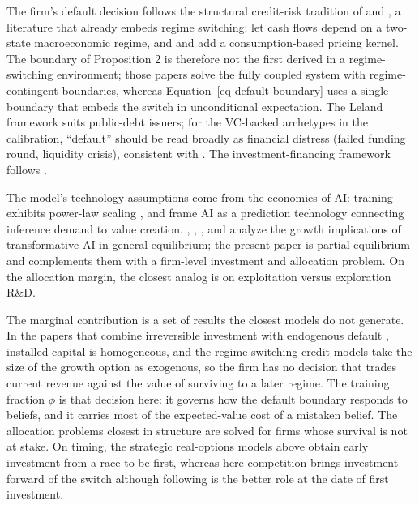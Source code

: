 \documentclass[
  11pt,
  letterpaper,
]{scrartcl}
\begin{document}
The firm's default decision follows the structural credit-risk tradition
of \citet{merton1974pricing} and \citet{leland1994corporate}, a
literature that already embeds regime switching:
\citet{hackbarth2006capital} let cash flows depend on a two-state
macroeconomic regime, and \citet{chen2010macroeconomic} and
\citet{bhamra2010levered} add a consumption-based pricing kernel. The
boundary of Proposition 2 is therefore not the first derived in a
regime-switching environment; those papers solve the fully coupled
system with regime-contingent boundaries, whereas
Equation~\ref{eq-default-boundary} uses a single boundary that embeds
the switch in unconditional expectation. The Leland framework suits
public-debt issuers; for the VC-backed archetypes in the calibration,
``default'' should be read broadly as financial distress (failed funding
round, liquidity crisis), consistent with \citet{gornall2020squaring}.
The investment-financing framework follows
\citet{hackbarth2012corporate}.

The model's technology assumptions come from the economics of AI:
training exhibits power-law scaling
\citep{kaplan2020scaling, hoffmann2022training}, and
\citet{agrawal2019economics} frame AI as a prediction technology
connecting inference demand to value creation.
\citet{aghion2019artificial}, \citet{acemoglu2024simple},
\citet{korinek2024scenarios}, and \citet{jones2024agi} analyze the
growth implications of transformative AI in general equilibrium; the
present paper is partial equilibrium and complements them with a
firm-level investment and allocation problem. On the allocation margin,
the closest analog is \citet{akcigit2018growth} on exploitation versus
exploration R\&D.

The marginal contribution is a set of results the closest models do not
generate. In the papers that combine irreversible investment with
endogenous default
\citep{mauer2005real, hackbarth2014capital, sundaresan2015dynamic, kumar2018optimal},
installed capital is homogeneous, and the regime-switching credit models
take the size of the growth option as exogenous, so the firm has no
decision that trades current revenue against the value of surviving to a
later regime. The training fraction \(\phi\) is that decision here: it
governs how the default boundary responds to beliefs, and it carries
most of the expected-value cost of a mistaken belief. The allocation
problems closest in structure
\citep{akcigit2018growth, chod2005resource} are solved for firms whose
survival is not at stake. On timing, the strategic real-options models
above obtain early investment from a race to be first, whereas here
competition brings investment forward of the switch although following
is the better role at the date of first investment.
\end{document}
